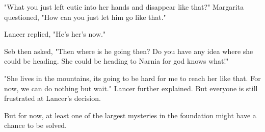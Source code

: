 "What you just left cutie into her hands and disappear like that?" Margarita questioned, "How can you just let him go like that."

Lancer replied, "He's her's now."

Seb then asked, "Then where is he going then? Do you have any idea where she could be heading. She could be heading to Narnia for god knows what!"

"She lives in the mountains, its going to be hard for me to reach her like that. For now, we can do nothing but wait." Lancer further explained. But everyone is still frustrated at Lancer's decision.

But for now, at least one of the largest mysteries in the foundation might have a chance to be solved.

